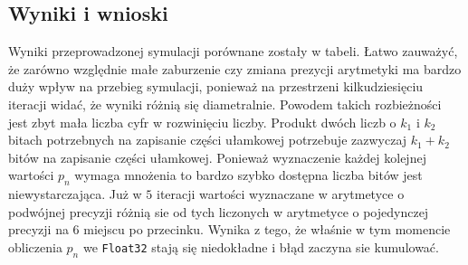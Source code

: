 \documentclass{article}
\begin{document}
\subsection{Wyniki i wnioski}
Wyniki przeprowadzonej symulacji porównane zostały w tabeli. Łatwo zauważyć, że zarówno względnie małe zaburzenie czy zmiana prezycji arytmetyki ma bardzo duży wpływ na przebieg symulacji, ponieważ na przestrzeni kilkudziesięciu iteracji widać, że wyniki różnią się diametralnie.
\newline Powodem takich rozbieżności jest zbyt mała liczba cyfr w rozwinięciu liczby. Produkt dwóch liczb o $k_1$ i $k_2$ bitach potrzebnych na zapisanie części ułamkowej potrzebuje zazwyczaj $k_1 + k_2$ bitów na zapisanie części ułamkowej. Ponieważ wyznaczenie każdej kolejnej wartości $p_n$ wymaga mnożenia to bardzo szybko dostępna liczba bitów jest niewystarczająca. Już w $5$ iteracji wartości wyznaczane w arytmetyce o podwójnej precyzji różnią sie od tych liczonych w arytmetyce o pojedynczej precyzji na $6$ miejscu po przecinku. Wynika z tego, że właśnie w tym momencie obliczenia $p_n$ we \texttt{Float32} stają się niedokładne i błąd zaczyna sie kumulować. 
\end{document}
